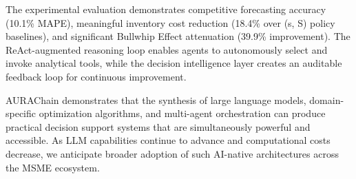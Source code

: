 \documentclass[conference]{IEEEtran}
\begin{document}
The experimental evaluation demonstrates competitive forecasting accuracy (10.1\% MAPE), meaningful inventory cost reduction (18.4\% over (s, S) policy baselines), and significant Bullwhip Effect attenuation (39.9\% improvement). The ReAct-augmented reasoning loop enables agents to autonomously select and invoke analytical tools, while the decision intelligence layer creates an auditable feedback loop for continuous improvement.

AURAChain demonstrates that the synthesis of large language models, domain-specific optimization algorithms, and multi-agent orchestration can produce practical decision support systems that are simultaneously powerful and accessible. As LLM capabilities continue to advance and computational costs decrease, we anticipate broader adoption of such AI-native architectures across the MSME ecosystem.
\end{document}
